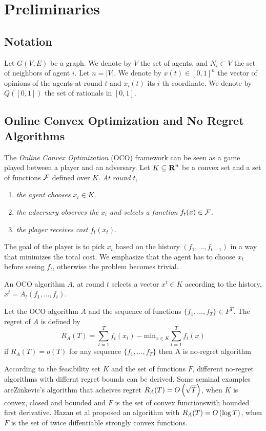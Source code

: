 \section{Preliminaries}
\subsection{Notation}
Let $G(V,E)$ be a graph. We denote by $V$ the set of agents,
and $N_{i} \subset V$ the set of neighbors of agent $i$. Let $n = |V|$.
We denote by $x(t)\in [0,1]^n$ the vector of opinions of the agents at round
$t$ and $x_i(t)$ its $i$-th coordinate. We denote by $Q([0,1])$
the set of rationals in $[0,1]$.

\subsection{Online Convex Optimization and No Regret Algorithms}
The \emph{Online Convex Optimization} (OCO) framework can be seen
as a game played between a player and an adversary. Let
$K \subseteq \bm{\mathrm{R}}^n$ be a convex set and a set of functions
$\mathcal{F}$ defined over $K$. \emph{At round }$t$,
\begin{enumerate}
  \item \emph{the agent chooses }$x_t \in K$.

  \item \emph{the adversary observes the }$x_t$\emph{ and selects a function}
    $f_t(x) \in \mathcal{F}$.

  \item \emph{the player receives cost }$f_t(x_t)$.
\end{enumerate}


\noindent The goal of the player is to pick $x_t$ based on the history
$(f_1,\ldots,f_{t-1})$ in a way that minimizes the total cost. We emphasize
that the agent has to choose $x_t$ before seeing $f_t$, otherwise the
problem becomes trivial.
\begin{definition}
An OCO algorithm $A$, at round $t$ selects a vector $x^t \in K$ according to the history, 
$x^t = A_t(f_1,\ldots,f_t)$.
\end{definition}

\begin{definition}
Let the OCO algorithm $A$ and the sequence of functions $\{f_1,\ldots,f_T\} \in F^T$. The regret of $A$ is defined by
\[R_A(T) = \sum_{t=1}^Tf_t(x_t) - \text{min}_{x \in K}\sum_{t=1}^Tf_t(x)\]
if $R_A(T) = o(T)$ for any sequence $\{f_1,\ldots,f_T\}$ then A is no-regret algorithm 
\end{definition}
According to the feasibility set $K$ and the set of functions $F$, different no-regret algorithms with differnt regret bounds can be derived. 
Some seminal examples areZinkevic's algorithm that acheives regret $R_A(T) =O\left(\sqrt{T}\right)$, when $K$ is convex, closed and bounded and 
$F$ is the set of convex functionswith bounded first derivative. Hazan et al \cite{} proposed an algorithm with $R_A(T) =O\left(\log T\right)$, 
when $F$ is the set of twice diffentiable strongly convex functions.\\

